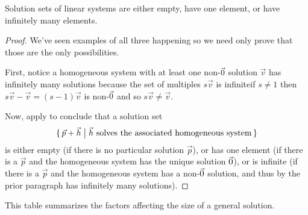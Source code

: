 \begin{corollary}
Solution sets of linear systems are either empty, have one element, or
have infinitely many elements.
\end{corollary}

\begin{proof}
We've seen examples of all three happening so we need only prove
that those are the only possibilities.

First, notice a homogeneous system with
at least one  non-\( \vec{0} \) solution $\vec{v}$ has infinitely many
solutions because the set of multiples $s\vec{v}$
is infinite\Dash if $s\neq 1$ then $s\vec{v}-\vec{v}=(s-1)\vec{v}$ is
non-$\vec{0}$ and so $s\vec{v}\neq \vec{v}$.

Now, apply  to conclude that a solution set
\begin{equation*}
  \mbox{$\{\,\vec{p}+\vec{h}\bigm|
    \text{\( \vec{h} \) solves the associated homogeneous system}\,\}$}
\end{equation*}
is either empty (if there is no particular solution \( \vec{p} \)),
or has one element (if there is a \( \vec{p} \) and the homogeneous system
has the unique solution \( \vec{0} \)), or is infinite (if there is a
\( \vec{p} \) and the homogeneous system has a non-$\vec{0}$ solution,
and thus by the prior paragraph has infinitely many solutions).
\end{proof}

This table summarizes the factors affecting the size of a
general solution.

